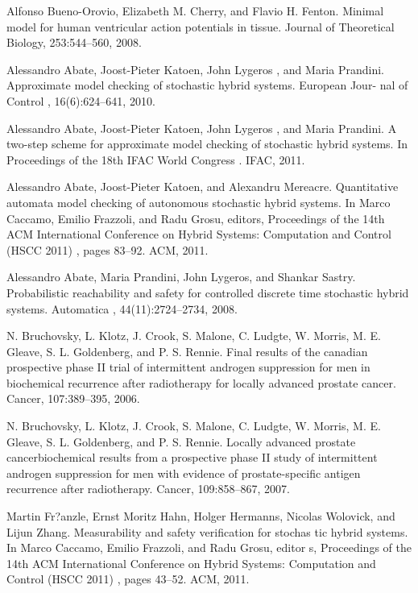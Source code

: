 \documentclass[runningheads,a4paper]{llncs}
\begin{document}
\noindent[AEF08] Alfonso Bueno-Orovio, Elizabeth M. Cherry, and Flavio H. Fenton. Minimal model for human ventricular action potentials in tissue. Journal of Theoretical Biology, 253:544–560, 2008.

\noindent[AKLP10] Alessandro Abate, Joost-Pieter Katoen, John Lygeros , and Maria Prandini. Approximate model checking of stochastic hybrid systems. European Jour- nal of Control , 16(6):624–641, 2010. 

\noindent[AKLP11] Alessandro Abate, Joost-Pieter Katoen, John Lygeros , and Maria Prandini. A two-step scheme for approximate model checking of stochastic hybrid systems. In Proceedings of the 18th IFAC World Congress . IFAC, 2011.

\noindent[AKM11] Alessandro Abate, Joost-Pieter Katoen, and Alexandru Mereacre. Quantitative automata model checking of autonomous stochastic hybrid systems. In Marco Caccamo, Emilio Frazzoli, and Radu Grosu, editors, Proceedings of the 14th ACM International Conference on Hybrid Systems: Computation and Control (HSCC 2011) , pages 83–92. ACM, 2011.

\noindent[APLS08] Alessandro Abate, Maria Prandini, John Lygeros, and Shankar Sastry. Probabilistic reachability and safety for controlled discrete time stochastic hybrid systems. Automatica , 44(11):2724–2734, 2008.

\noindent[BKC06] N. Bruchovsky, L. Klotz, J. Crook, S. Malone, C. Ludgte, W. Morris, M. E. Gleave, S. L. Goldenberg, and P. S. Rennie. Final results of the canadian prospective phase II trial of intermittent androgen suppression for men in biochemical recurrence after radiotherapy for locally advanced prostate cancer. Cancer, 107:389–395, 2006.

\noindent[BKC07] N. Bruchovsky, L. Klotz, J. Crook, S. Malone, C. Ludgte, W. Morris, M. E. Gleave, S. L. Goldenberg, and P. S. Rennie. Locally advanced prostate cancerbiochemical results from a prospective phase II study of intermittent androgen suppression for men with evidence of prostate-specific antigen recurrence after radiotherapy. Cancer, 109:858–867, 2007.

\noindent[FHH + 11] Martin Fr?anzle, Ernst Moritz Hahn, Holger Hermanns, Nicolas Wolovick, and Lijun Zhang. Measurability and safety verification for stochas tic hybrid systems. In Marco Caccamo, Emilio Frazzoli, and Radu Grosu, editor s, Proceedings of the 14th ACM International Conference on Hybrid Systems: Computation and Control (HSCC 2011) , pages 43–52. ACM, 2011.
\end{document}
